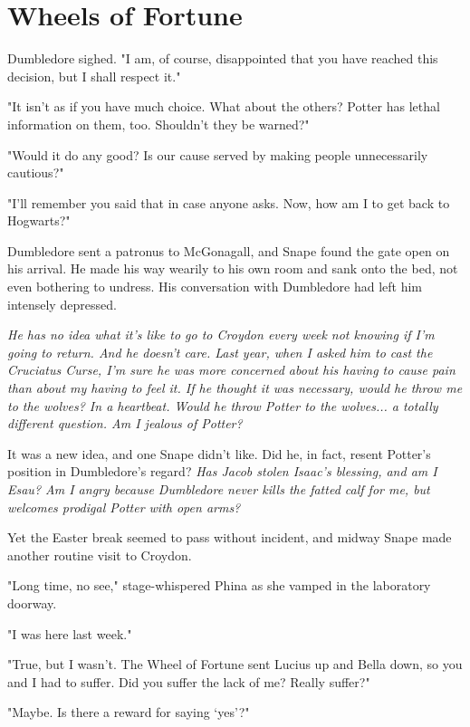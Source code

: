 
\chapter{Wheels of Fortune}

Dumbledore sighed. "I am, of course, disappointed that you have reached this decision, but I shall respect it."

"It isn't as if you have much choice. What about the others? Potter has lethal information on them, too. Shouldn't they be warned?"

"Would it do any good? Is our cause served by making people unnecessarily cautious?"

"I'll remember you said that in case anyone asks. Now, how am I to get back to Hogwarts?"

Dumbledore sent a patronus to McGonagall, and Snape found the gate open on his arrival. He made his way wearily to his own room and sank onto the bed, not even bothering to undress. His conversation with Dumbledore had left him intensely depressed.

\emph{He has no idea what it's like to go to Croydon every week not knowing if I'm going to return. And he doesn't care. Last year, when I asked him to cast the Cruciatus Curse, I'm sure he was more concerned about his having to cause pain than about my having to feel it. If he thought it was necessary, would he throw me to the wolves? In a heartbeat. Would he throw Potter to the wolves... a totally different question. Am I jealous of Potter?}

It was a new idea, and one Snape didn't like. Did he, in fact, resent Potter's position in Dumbledore's regard? \emph{Has Jacob stolen Isaac's blessing, and am I Esau? Am I angry because Dumbledore never kills the fatted calf for me, but welcomes prodigal Potter with open arms?}

Yet the Easter break seemed to pass without incident, and midway Snape made another routine visit to Croydon.

"Long time, no see," stage-whispered Phina as she vamped in the laboratory doorway.

"I was here last week."

"True, but I wasn't. The Wheel of Fortune sent Lucius up and Bella down, so you and I had to suffer. Did you suffer the lack of me? Really suffer?"

"Maybe. Is there a reward for saying `yes'?"

